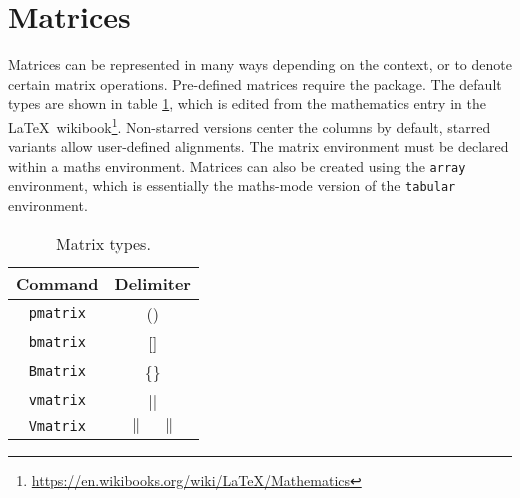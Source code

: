 \section{Matrices}
%
Matrices can be represented in many ways depending on the context, or
to denote certain matrix operations.  Pre-defined matrices require the
 package.  The default types are shown in table
\ref{t:mat}, which is edited from the mathematics entry in the
\LaTeX~wikibook\footnote{\url{https://en.wikibooks.org/wiki/LaTeX/Mathematics}}.
Non-starred versions center the columns by default, starred variants
allow user-defined alignments.  The matrix environment must be
declared within a maths environment.  Matrices can also be created
using the \verb|array| environment, which is essentially the
maths-mode version of the \verb|tabular| environment.
\begin{table}[!htbp]
    \centering
    \caption{Matrix types.}
    \label{t:mat}
    \begin{tabular}{cc}
        \toprule
        Command & Delimiter \\
        \midrule
        \verb|pmatrix| & (\quad) \\
        \verb|bmatrix| & [\quad] \\
        \verb|Bmatrix| & \{\quad\} \\
        \verb|vmatrix| & |\quad| \\
        \verb|Vmatrix| & $\|\quad\|$ \\
        \bottomrule
    \end{tabular}
\end{table}
%
